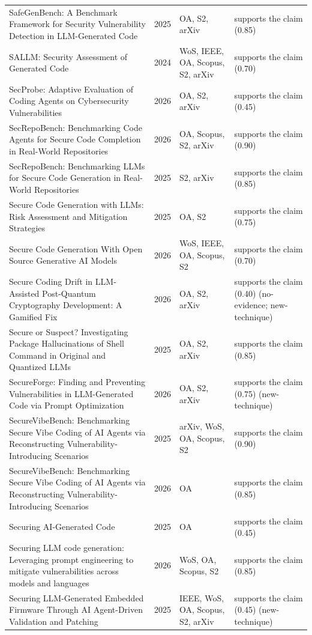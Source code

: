 \begin{longtable}{@{}%
  >{\raggedright\arraybackslash}p{}c%
  >{\raggedright\arraybackslash}p{}%
  >{\raggedright\arraybackslash}p{}@{}}
SafeGenBench: A Benchmark Framework for Security Vulnerability Detection in LLM-Generated Code & 2025 & OA, S2, arXiv & supports the claim (0.85) \\
SALLM: Security Assessment of Generated Code & 2024 & WoS, IEEE, OA, Scopus, S2, arXiv & supports the claim (0.70) \\
SecProbe: Adaptive Evaluation of Coding Agents on Cybersecurity Vulnerabilities & 2026 & OA, S2, arXiv & supports the claim (0.45) \\
SecRepoBench: Benchmarking Code Agents for Secure Code Completion in Real-World Repositories & 2026 & OA, Scopus, S2, arXiv & supports the claim (0.90) \\
SecRepoBench: Benchmarking LLMs for Secure Code Generation in Real-World Repositories & 2025 & S2, arXiv & supports the claim (0.85) \\
Secure Code Generation with LLMs: Risk Assessment and Mitigation Strategies & 2025 & OA, S2 & supports the claim (0.75) \\
Secure Code Generation With Open Source Generative AI Models & 2026 & WoS, IEEE, OA, Scopus, S2 & supports the claim (0.70) \\
Secure Coding Drift in LLM-Assisted Post-Quantum Cryptography Development: A Gamified Fix & 2026 & OA, S2, arXiv & supports the claim (0.40) (no-evidence; new-technique) \\
Secure or Suspect? Investigating Package Hallucinations of Shell Command in Original and Quantized LLMs & 2025 & OA, S2, arXiv & supports the claim (0.85) \\
SecureForge: Finding and Preventing Vulnerabilities in LLM-Generated Code via Prompt Optimization & 2026 & OA, S2, arXiv & supports the claim (0.75) (new-technique) \\
SecureVibeBench: Benchmarking Secure Vibe Coding of AI Agents via Reconstructing Vulnerability-Introducing Scenarios & 2025 & arXiv, WoS, OA, Scopus, S2 & supports the claim (0.90) \\
SecureVibeBench: Benchmarking Secure Vibe Coding of AI Agents via Reconstructing Vulnerability-Introducing Scenarios & 2026 & OA & supports the claim (0.85) \\
Securing AI-Generated Code & 2025 & OA & supports the claim (0.45) \\
Securing LLM code generation: Leveraging prompt engineering to mitigate vulnerabilities across models and languages & 2026 & WoS, OA, Scopus, S2 & supports the claim (0.85) \\
Securing LLM-Generated Embedded Firmware Through AI Agent-Driven Validation and Patching & 2025 & IEEE, WoS, OA, Scopus, S2, arXiv & supports the claim (0.45) (new-technique) \\

\end{longtable}
